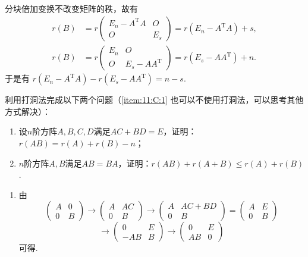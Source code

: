 \begin{exercise}
\begin{exgroup}
\begin{answer}
\begin{gather*}
            \end{gather*}
            分块倍加变换不改变矩阵的秩，故有
            \begin{align*}
                r(B) &= r\begin{pmatrix}
                    E_n - A^\mathrm{T}A & O   \\
                    O                   & E_s
                \end{pmatrix} = r(E_n - A^\mathrm{T}A) + s, \\
                r(B) &= r\begin{pmatrix}
                    E_n & O                   \\
                    O   & E_s - AA^\mathrm{T}
                \end{pmatrix} = r(E_s - AA^\mathrm{T}) + n.
            \end{align*}
            于是有 $r(E_n-A^\mathrm{T}A)-r(E_s-AA^\mathrm{T})=n-s$.
        \end{answer}

        \item 利用打洞法完成以下两个问题（\ref*{item:11:C:1} 也可以不使用打洞法，可以思考其他方式解决）：
        \begin{enumerate}
            \item 设$n$阶方阵$A,B,C,D$满足$AC+BD=E$，证明：$r(AB) = r(A)+r(B)-n$；

            \item \label{item:11:C:1}
                  $n$阶方阵$A,B$满足$AB=BA$，证明：$r(AB)+r(A+B)\leqslant r(A)+r(B)$.
        \end{enumerate}
        \begin{answer}
            \begin{enumerate}
                \item 由 \[\begin{pmatrix}A & 0 \\ 0 & B\end{pmatrix}\rightarrow \begin{pmatrix}A & AC \\ 0 & B\end{pmatrix}\rightarrow \begin{pmatrix}A & AC+BD \\ 0 & B\end{pmatrix}=\begin{pmatrix}A & E \\ 0 & B\end{pmatrix}\]
                      \[\rightarrow \begin{pmatrix}0 & E \\ -AB & B\end{pmatrix}\rightarrow \begin{pmatrix}0 & E \\ AB & 0\end{pmatrix}\]
                      可得.


\end{enumerate}
\end{answer}
\end{exgroup}
\end{exercise}

